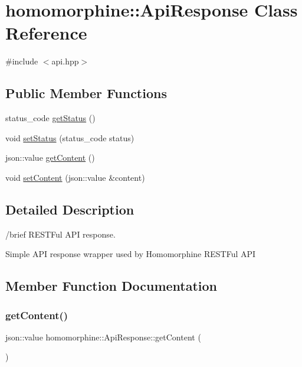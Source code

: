 \hypertarget{classhomomorphine_1_1_api_response}{}\section{homomorphine\+:\+:Api\+Response Class Reference}
\label{classhomomorphine_1_1_api_response}


{\ttfamily \#include $<$api.\+hpp$>$}

\subsection*{Public Member Functions}
\begin{DoxyCompactItemize}
\item 
status\+\_\+code \hyperlink{classhomomorphine_1_1_api_response_abe5d8dbece3cffee08905bb9389a8fd0}{get\+Status} ()
\item 
void \hyperlink{classhomomorphine_1_1_api_response_a3823ad464f6011397be80c62e391171c}{set\+Status} (status\+\_\+code status)
\item 
json\+::value \hyperlink{classhomomorphine_1_1_api_response_ae816a0c652d2cd47d88a67dda85024c4}{get\+Content} ()
\item 
void \hyperlink{classhomomorphine_1_1_api_response_aee304405cacc0b976145d2a3465ea7e5}{set\+Content} (json\+::value \&content)
\end{DoxyCompactItemize}


\subsection{Detailed Description}
/brief R\+E\+S\+T\+Ful A\+PI response.

Simple A\+PI response wrapper used by Homomorphine R\+E\+S\+T\+Ful A\+PI 

\subsection{Member Function Documentation}
\mbox{\label{classhomomorphine_1_1_api_response_ae816a0c652d2cd47d88a67dda85024c4}} 
\subsubsection{\texorpdfstring{get\+Content()}{getContent()}}
{\footnotesize\ttfamily json\+::value homomorphine\+::\+Api\+Response\+::get\+Content (\begin{DoxyParamCaption}{ }\end{DoxyParamCaption})}

